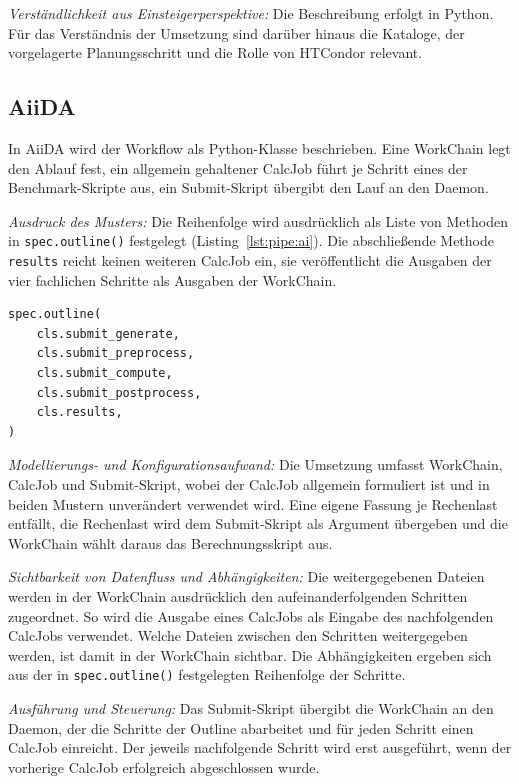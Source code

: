 \emph{Verständlichkeit aus Einsteigerperspektive:} Die Beschreibung
erfolgt in Python. Für das Verständnis der Umsetzung sind darüber
hinaus die Kataloge, der vorgelagerte
Planungsschritt und die Rolle von HTCondor relevant.

\subsection{AiiDA}
\label{sec:lokal:pipeline:aiida}

In AiiDA wird der Workflow als Python-Klasse beschrieben. Eine
WorkChain legt den Ablauf fest, ein allgemein gehaltener CalcJob
führt je Schritt eines der Benchmark-Skripte aus, ein Submit-Skript
übergibt den Lauf an den Daemon.

\emph{Ausdruck des Musters:} Die Reihenfolge wird ausdrücklich als
Liste von Methoden in \texttt{spec.outline()} festgelegt (Listing~\ref{lst:pipe:ai}). Die
abschließende Methode \texttt{results} reicht keinen weiteren
CalcJob ein, sie veröffentlicht die Ausgaben der vier fachlichen
Schritte als Ausgaben der WorkChain.

\begin{lstlisting}[language=Python,caption={Reihenfolge in spec.outline() (AiiDA, Pipeline)},label={lst:pipe:ai}]
spec.outline(
    cls.submit_generate,
    cls.submit_preprocess,
    cls.submit_compute,
    cls.submit_postprocess,
    cls.results,
)
\end{lstlisting}

\emph{Modellierungs- und Konfigurationsaufwand:} Die Umsetzung
umfasst WorkChain, CalcJob und Submit-Skript, wobei der CalcJob
allgemein formuliert ist und in beiden Mustern unverändert verwendet
wird. Eine eigene Fassung je Rechenlast entfällt, die Rechenlast wird
dem Submit-Skript als Argument übergeben und die WorkChain wählt
daraus das Berechnungsskript aus.

\emph{Sichtbarkeit von Datenfluss und Abhängigkeiten:} Die
weitergegebenen Dateien werden in der WorkChain ausdrücklich den
aufeinanderfolgenden Schritten zugeordnet. So wird die Ausgabe eines
CalcJobs als Eingabe des nachfolgenden CalcJobs verwendet. Welche
Dateien zwischen den Schritten weitergegeben werden, ist damit in der
WorkChain sichtbar. Die Abhängigkeiten ergeben sich aus der
in \texttt{spec.outline()} festgelegten Reihenfolge der Schritte.

\emph{Ausführung und Steuerung:} Das Submit-Skript übergibt die
WorkChain an den Daemon, der die Schritte der Outline abarbeitet und
für jeden Schritt einen CalcJob einreicht. Der jeweils nachfolgende
Schritt wird erst ausgeführt, wenn der vorherige CalcJob erfolgreich
abgeschlossen wurde.

